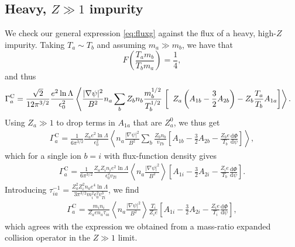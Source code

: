 \documentclass[12pt, a4paper]{article}
\renewcommand{\d}{\ensuremath{\mathrm{d}}}
\newcommand{\lang}{\left\langle}
\newcommand{\rang}{\right\rangle}
\begin{document}
\clearpage
\subsection{Heavy, $Z\gg 1$ impurity}
We check our general expression \eqref{eq:fluxg} against the flux of a heavy, high-$Z$ impurity. Taking $T_a \sim T_b$ and assuming $m_a \gg m_b$, we have that
\begin{equation}
F\left(\frac{T_a m_b}{T_b m_a}\right) = \frac{1}{4},
\end{equation}
and thus
\begin{equation}
  \begin{aligned}
   \Gamma_a^{\text{C}} = \frac{\sqrt{2}}{12\pi^{3/2}} \frac{ e^2 \ln \Lambda}{\epsilon_0^2 } 
    \lang \frac{|\nabla \psi|^2}{B^2} n_a \sum_b Z_b n_b \frac{m_b^{1/2}}{T_b^{1/2}} \right.\left[\vphantom{\frac{T_am_b}{T_bm_a}} \right.
      &\left.\left.Z_a     \left(A_{1b} - \frac{3}{2} A_{2b}\right)  - Z_b  \frac{T_a}{T_b}A_{1a} \right] \rang.
\end{aligned} \label{eq:fluxheavy}
\end{equation}
Using $Z_a \gg 1$ to drop terms in $A_{1a}$ that are $Z_a^0$, we thus get
\begin{equation}
  \begin{aligned}
     \Gamma_a^{\text{C}} = \frac{1}{6\pi^{3/2}} \frac{  Z_a e^2 \ln \Lambda}{\epsilon_0^2 } 
    \lang n_a \frac{|\nabla \psi|^2}{B^2} \sum_b \frac{Z_b n_b }{v_{Tb}} \left[ A_{1b} - \frac{3}{2} A_{2b} - \frac{Z_b e}{T_b}\frac{\d \Phi}{\d \psi}\right] \rang,
\end{aligned}
\end{equation}
which for a single ion $b = i$ with flux-function density gives
\begin{equation}
  \begin{aligned}
\Gamma_a^{\text{C}} = \frac{1}{6\pi^{3/2}} \frac{ Z_a Z_i n_i e^2 \ln \Lambda}{\epsilon_0^2 v_{Ti}} 
    \lang n_a  \frac{|\nabla \psi|^2}{B^2} \rang \left[ A_{1i} - \frac{3}{2} A_{2i} - \frac{Z_i e}{T_b} \frac{\d \Phi}{\d \psi}\right].
  \end{aligned}
\end{equation}
Introducing $\tau_{ia}^{-1} = \frac{Z_a^2 Z_i^2 n_a e^4 \ln \Lambda}{3\pi^{3/2} m_i^2 \epsilon_0^2 v_{Ti}^3}$, we find
\begin{equation}
  \begin{aligned}
\Gamma_a^{\text{C}} =  \frac{m_i n_i}{Z_a e n_a\tau_{ia}}
    \lang n_a  \frac{|\nabla \psi|^2}{B^2} \rang \frac{T_i}{Z_i e}\left[ A_{1i} - \frac{3}{2} A_{2i} - \frac{Z_i e}{T_i} \frac{\d \Phi}{\d \psi}\right],
  \end{aligned}
\end{equation}
which agrees with the expression we obtained from a mass-ratio expanded collision operator in the $Z\gg 1$ limit.
\end{document}
